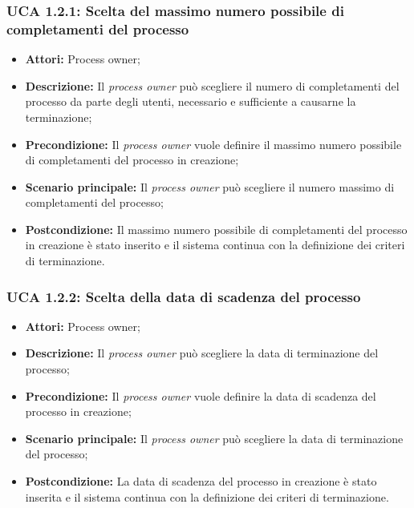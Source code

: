 \hypertarget{A1.2.1}{}
\subsubsection{UCA 1.2.1: Scelta del massimo numero possibile di completamenti del processo}

\begin{itemize}
\item \textbf{Attori:} Process owner;
\item \textbf{Descrizione:}
Il \textit{process owner} può scegliere il numero di completamenti del processo da parte degli utenti, necessario e sufficiente a causarne la terminazione;
\item \textbf{Precondizione:}
Il \textit{process owner} vuole definire il massimo numero possibile di completamenti del processo in creazione;
\item \textbf{Scenario principale:}
Il \textit{process owner} può scegliere il numero massimo di completamenti del processo;
\item \textbf{Postcondizione:}
Il massimo numero possibile di completamenti del processo in creazione è stato inserito e il sistema continua con la definizione dei criteri di terminazione.
\end{itemize}

\hypertarget{A1.2.2}{}
\subsubsection{UCA 1.2.2: Scelta della data di scadenza del processo}

\begin{itemize}
\item \textbf{Attori:} Process owner;
\item \textbf{Descrizione:}
Il \textit{process owner} può scegliere la data di terminazione del processo;
\item \textbf{Precondizione:}
Il \textit{process owner} vuole definire la data di scadenza del processo in creazione;
\item \textbf{Scenario principale:}
Il \textit{process owner} può scegliere la data di terminazione del processo;
\item \textbf{Postcondizione:}
La data di scadenza del processo in creazione è stato inserita e il sistema continua con la definizione dei criteri di terminazione.
\end{itemize}

